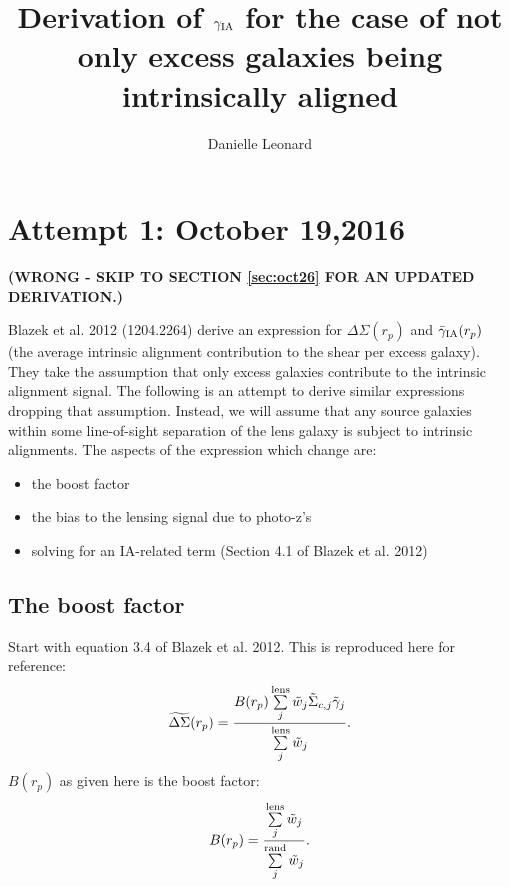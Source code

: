 \documentclass[onecolumn,amsmath,aps,fleqn, superscriptaddress]{revtex4}
\begin{document}
\title{Derivation of $\gamma_{\rm IA}$ for the case of not only excess galaxies being intrinsically aligned}

\author{Danielle Leonard}

\maketitle

\section{Attempt 1: October 19,2016}

{\bf (WRONG - SKIP TO SECTION \ref{sec:oct26} FOR AN UPDATED DERIVATION.)}

Blazek et al. 2012 (1204.2264) derive an expression for $\Delta \Sigma(r_p)$ and $\bar{\gamma}_{\rm IA}(r_p)$ (the average intrinsic alignment contribution to the shear per excess galaxy). They take the assumption that only excess galaxies contribute to the intrinsic alignment signal. The following is an attempt to derive similar expressions dropping that assumption. Instead, we will assume that any source galaxies within some line-of-sight separation of the lens galaxy is subject to intrinsic alignments. The aspects of the expression which change are:
\begin{itemize}
\item{the boost factor}
\item{the bias to the lensing signal due to photo-z's}
\item{solving for an IA-related term (Section 4.1 of Blazek et al. 2012)}
\end{itemize}


\subsection*{The boost factor}
Start with equation 3.4 of Blazek et al. 2012. This is reproduced here for reference:
\begin{equation}
\widetilde{\Delta \Sigma}(r_p) = \frac{B(r_p) \sum\limits_{j}^{\rm lens} \tilde{w}_j \tilde{\Sigma}_{c,j} \tilde{\gamma}_j}{\sum\limits_{j}^{\rm lens} \tilde{w}_j}.
\label{Blazek3pt4}
\end{equation}
$B(r_p)$ as given here is the boost factor:
\begin{equation}
B(r_p) = \frac{\sum\limits_{j}^{\rm lens}\tilde{w}_j}{\sum\limits_{j}^{\rm rand} \tilde{w}_j}.
\label{Blazek3pt6}
\end{equation}
\end{document}
